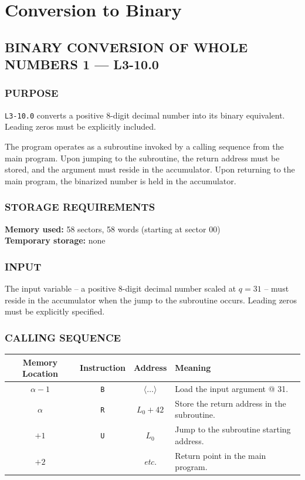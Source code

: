 \section{Conversion to Binary}
\subsection*{BINARY CONVERSION OF WHOLE NUMBERS 1 --- L3-10.0}

\subsubsection*{PURPOSE}
\texttt{L3-10.0} converts a positive 8-digit decimal number into its binary equivalent. Leading zeros must be explicitly included.

The program operates as a subroutine invoked by a calling sequence from the main program. Upon jumping to the subroutine, the return address must be stored, and the argument must reside in the accumulator. Upon returning to the main program, the binarized number is held in the accumulator.

\subsubsection*{STORAGE REQUIREMENTS}
\textbf{Memory used:} 58 sectors, 58 words (starting at sector 00) \\
\textbf{Temporary storage:} none

\subsubsection*{INPUT}
The input variable -- a positive 8-digit decimal number scaled at $q = 31$ -- must reside in the accumulator when the jump to the subroutine occurs. Leading zeros must be explicitly specified.

\subsubsection*{CALLING SEQUENCE}
\begin{table}[h!]
\centering
\begin{tabularx}{\textwidth}{cccX}
\toprule
\textbf{Memory Location} & \textbf{Instruction} & \textbf{Address} & \textbf{Meaning} \\
\midrule
$\alpha - 1$ & \texttt{B} & $\langle \dots \rangle$ & Load the input argument @ 31. \\
$\alpha$     & \texttt{R} & $L_0 + 42$              & Store the return address in the subroutine. \\
$+1$         & \texttt{U} & $L_0$                   & Jump to the subroutine starting address. \\
$+2$         &            & \textit{etc.}           & Return point in the main program. \\
\bottomrule
\end{tabularx}
\end{table}

